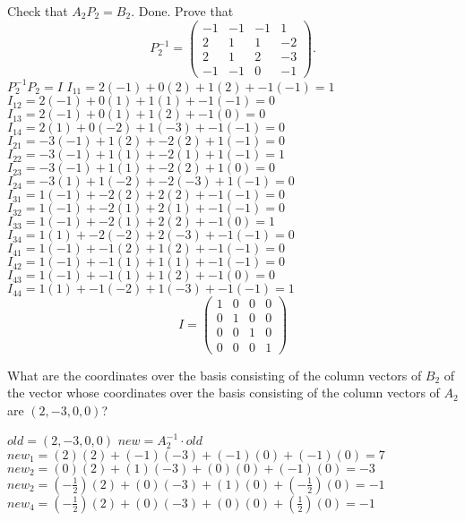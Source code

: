\documentclass[12pt]{article}
\begin{document}
\begin{itemize}
Check that $A_2P_2 = B_2$.
\newline Done.
\newline Prove that
\[
P_2^{-1} = 
\begin{pmatrix}
-1 & -1 & -1 & 1\\
2 & 1 & 1 & -2 \\
2 & 1 & 2 & -3 \\
-1 & -1 & 0 & -1
\end{pmatrix} .
\]
$P_2^{-1}P_2=I$
\newline $I_{11}=2(-1)+0(2)+1(2)+-1(-1)=1$
\newline $I_{12}=2(-1)+0(1)+1(1)+-1(-1)=0$
\newline $I_{13}=2(-1)+0(1)+1(2)+-1(0)=0$
\newline $I_{14}=2(1)+0(-2)+1(-3)+-1(-1)=0$
\newline $I_{21}=-3(-1)+1(2)+-2(2)+1(-1)=0$
\newline $I_{22}=-3(-1)+1(1)+-2(1)+1(-1)=1$
\newline $I_{23}=-3(-1)+1(1)+-2(2)+1(0)=0$
\newline $I_{24}=-3(1)+1(-2)+-2(-3)+1(-1)=0$
\newline $I_{31}=1(-1)+-2(2)+2(2)+-1(-1)=0$
\newline $I_{32}=1(-1)+-2(1)+2(1)+-1(-1)=0$
\newline $I_{33}=1(-1)+-2(1)+2(2)+-1(0)=1$
\newline $I_{34}=1(1)+-2(-2)+2(-3)+-1(-1)=0$
\newline $I_{41}=1(-1)+-1(2)+1(2)+-1(-1)=0$
\newline $I_{42}=1(-1)+-1(1)+1(1)+-1(-1)=0$
\newline $I_{43}=1(-1)+-1(1)+1(2)+-1(0)=0$
\newline $I_{44}=1(1)+-1(-2)+1(-3)+-1(-1)=1$
\[
I = 
\begin{pmatrix}
1 & 0 & 0 & 0\\
0 & 1 & 0 & 0 \\
0 & 0 & 1 & 0 \\
0 & 0 & 0 & 1
\end{pmatrix}
\]

What are the coordinates over the basis consisting of the
column vectors of $B_2$ of the vector whose coordinates over the
basis  consisting of the column vectors of $A_2$ are
$(2, -3, 0, 0)$?
\end{itemize}
$old=(2,-3,0,0)$
\newline $new=A_2^{-1}\cdot old$
\newline $new_1=(2)(2)+(-1)(-3)+(-1)(0)+(-1)(0)=7$
\newline $new_2=(0)(2)+(1)(-3)+(0)(0)+(-1)(0)=-3$
\newline $new_2=(-\frac{1}{2})(2)+(0)(-3)+(1)(0)+(-\frac{1}{2})(0)=-1$
\newline $new_4=(-\frac{1}{2})(2)+(0)(-3)+(0)(0)+(\frac{1}{2})(0)=-1$
\end{document}
